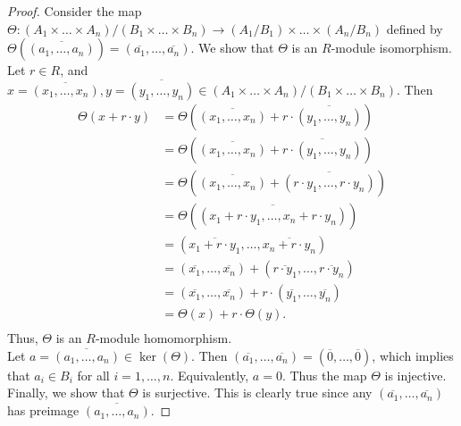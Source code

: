 \documentclass{article}
\begin{document}
  \begin{proof}
    Consider the map $\Theta:(A_1\times\ldots\times
    A_n)/(B_1\times\ldots\times B_n)
    \rightarrow(A_1/B_1)\times\ldots\times(A_n/B_n)$ defined by
    $\Theta(\overline{(a_1,\ldots,a_n)})
    =(\overline{a_1},\ldots,\overline{a_n})$. We show that $\Theta$ is an
    $R$-module isomorphism. \\

    Let $r\in R$, and $x=\overline{(x_1,\ldots,x_n)},
    y=\overline{(y_1,\ldots,y_n)}\in (A_1\times\ldots\times
    A_n)/(B_1\times\ldots\times B_n)$. Then
    \begin{align*}
      \Theta(x+r\cdot y) &=\Theta(\overline{(x_1,\ldots,x_n)}
        +r\cdot\overline{(y_1,\ldots,y_n)}) \\
      &=\Theta(\overline{(x_1,\ldots,x_n)}
        +\overline{r\cdot(y_1,\ldots,y_n)}) \\
      &=\Theta(\overline{(x_1,\ldots,x_n)}
        +\overline{(r\cdot y_1,\ldots,r\cdot y_n)}) \\
      &=\Theta(\overline{(x_1+r\cdot y_1,\ldots,x_n+r\cdot y_n)}) \\
      &=(\overline{x_1+r\cdot y_1},\ldots,\overline{x_n+r\cdot y_n}) \\
      &=(\overline{x_1},\ldots,\overline{x_n})
        +(\overline{r\cdot y_1},\ldots,\overline{r\cdot y_n}) \\
      &=(\overline{x_1},\ldots,\overline{x_n})
        +r\cdot(\overline{y_1},\ldots,\overline{y_n}) \\
      &=\Theta(x)+r\cdot\Theta(y). \\
    \end{align*}
    Thus, $\Theta$ is an $R$-module homomorphism. \\

    Let $a=\overline{(a_1,\ldots,a_n)}\in\ker(\Theta)$. Then
    $(\overline{a_1},\ldots,\overline{a_n})
    =(\overline{0},\ldots,\overline{0})$, which implies that $a_i\in B_i$
    for all $i=1,\ldots,n$. Equivalently, $a=0$. Thus the map $\Theta$ is
    injective. \\

    Finally, we show that $\Theta$ is surjective. This is clearly true
    since any $(\overline{a_1},\ldots,\overline{a_n})$ has preimage
    $\overline{(a_1,\ldots,a_n)}$.
  \end{proof}
\end{document}
